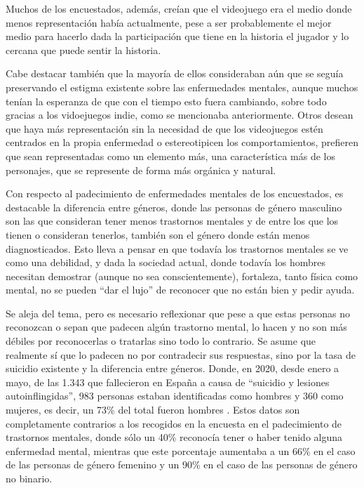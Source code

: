 \documentclass[12pt, a4paper,twoside,titlepage]{book}
\begin{document}
Muchos de los encuestados, además, creían que el videojuego era el medio donde menos representación había actualmente, pese a ser probablemente el mejor medio para hacerlo dada la participación que tiene en la historia el jugador y lo cercana que puede sentir la historia. 

Cabe destacar también que la mayoría de ellos consideraban aún que se seguía preservando el estigma existente sobre las enfermedades mentales, aunque muchos tenían la esperanza de que con el tiempo esto fuera cambiando, sobre todo gracias a los vidoejuegos indie, como se mencionaba anteriormente. Otros desean que haya más representación sin la necesidad de que los videojuegos estén centrados en la propia enfermedad o estereotipicen los comportamientos, prefieren que sean representadas como un elemento más, una característica más de los personajes, que se represente de forma más orgánica y natural. 

Con respecto al padecimiento de enfermedades mentales de los encuestados, es destacable la diferencia entre géneros, donde las personas de género masculino son las que consideran tener menos trastornos mentales y de entre los que los tienen o consideran tenerlos, también son el género donde están menos diagnosticados. Esto lleva a pensar en que todavía los trastornos mentales se ve como una debilidad, y dada la sociedad actual, donde todavía los hombres necesitan demostrar (aunque no sea conscientemente), fortaleza, tanto física como mental, no se pueden ``dar el lujo'' de reconocer que no están bien y pedir ayuda. 

Se aleja del tema, pero es necesario reflexionar que pese a que estas personas no reconozcan o sepan que padecen algún trastorno mental, lo hacen y no son más débiles por reconocerlas o tratarlas sino todo lo contrario. Se asume que realmente sí que lo padecen no por contradecir sus respuestas, sino por la tasa de suicidio existente y la diferencia entre géneros. Donde, en 2020, desde enero a mayo, de las 1.343 que fallecieron en España a causa de ``suicidio y lesiones autoinflingidas'', 983 personas estaban identificadas como hombres y 360 como mujeres, es decir, un 73\% del total fueron hombres \cite{datosINEsuicidio}. Estos datos son completamente contrarios a los recogidos en la encuesta en el padecimiento de trastornos mentales, donde sólo un 40\% reconocía tener o haber tenido alguna enfermedad mental, mientras que este porcentaje aumentaba a un 66\% en el caso de las personas de género femenino y un 90\% en el caso de las personas de género no binario. 
\end{document}
